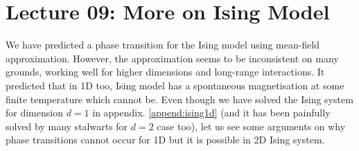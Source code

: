 \section*{Lecture 09: More on Ising Model}
We have predicted a phase transition for the Ising model using mean-field approximation. However, the approximation seems to be inconsistent on many grounds, working well for higher dimensions and long-range interactions. It predicted that in 1D too, Ising model has a spontaneous magnetisation at some finite temperature which cannot be. Even though we have solved the Ising system for dimension $d=1$ in appendix. \ref{append:ising1d} (and it has been painfully solved by many stalwarts for $d=2$ case too), let us see some arguments on why phase transitions cannot occur for 1D but it is possible in 2D Ising system. 
